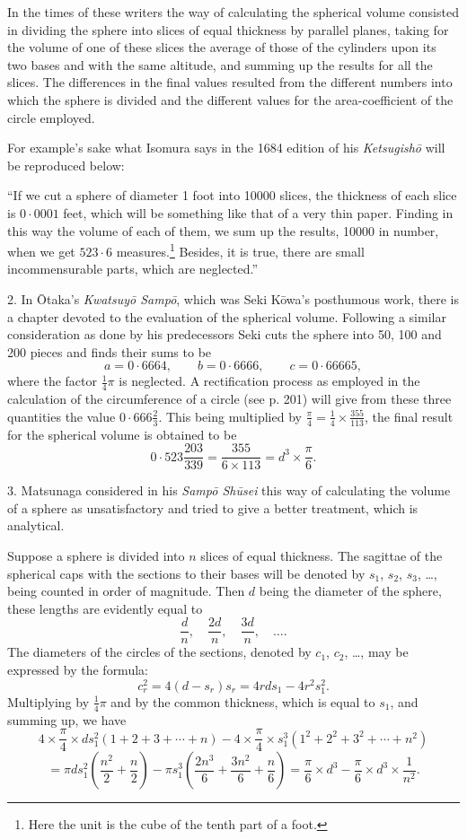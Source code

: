 \documentclass[11pt]{article}
\newcommand{\scanpage}[2]{\clearpage\setcounter{footnote}{0}\noindent{\footnotesize\color{gray}PDF page #1 · #2}\par\medskip}
\newcommand{\scanfooter}{}
\begin{document}
In the times of these writers the way of calculating the spherical volume consisted in dividing the sphere into slices of equal thickness by parallel planes, taking for the volume of one of these slices the average of those of the cylinders upon its two bases and with the same altitude, and summing up the results for all the slices. The differences in the final values resulted from the different numbers into which the sphere is divided and the different values for the area-coefficient of the circle employed.
\scanfooter

\scanpage{0218}{Chapter 26, printed page 204}
For example's sake what Isomura says in the 1684 edition of his \emph{Ketsugishō} will be reproduced below:

``If we cut a sphere of diameter 1 foot into 10000 slices, the thickness of each slice is $0\cdot0001$ feet, which will be something like that of a very thin paper. Finding in this way the volume of each of them, we sum up the results, 10000 in number, when we get $523\cdot6$ measures.\footnote{Here the unit is the cube of the tenth part of a foot.} Besides, it is true, there are small incommensurable parts, which are neglected.''

2. In Ōtaka's \emph{Kwatsuyō Sampō}, which was Seki Kōwa's posthumous work, there is a chapter devoted to the evaluation of the spherical volume. Following a similar consideration as done by his predecessors Seki cuts the sphere into 50, 100 and 200 pieces and finds their sums to be
\[
a=0\cdot6664,\qquad b=0\cdot6666,\qquad c=0\cdot66665,
\]
where the factor $\frac14\pi$ is neglected. A rectification process as employed in the calculation of the circumference of a circle (see p. 201) will give from these three quantities the value $0\cdot666\frac23$. This being multiplied by $\frac{\pi}{4}=\frac14\times\frac{355}{113}$, the final result for the spherical volume is obtained to be
\[
0\cdot523\frac{203}{339}=\frac{355}{6\times113}=d^3\times\frac{\pi}{6}.
\]

3. Matsunaga considered in his \emph{Sampō Shūsei} this way of calculating the volume of a sphere as unsatisfactory and tried to give a better treatment, which is analytical.

Suppose a sphere is divided into $n$ slices of equal thickness. The sagittae of the spherical caps with the sections to their bases will be denoted by $s_1$, $s_2$, $s_3$, \ldots, being counted in order of magnitude. Then $d$ being the diameter of the sphere, these lengths are evidently equal to
\[
\frac dn,\quad \frac{2d}{n},\quad \frac{3d}{n},\quad\ldots.
\]
The diameters of the circles of the sections, denoted by $c_1$, $c_2$, \ldots, may be expressed by the formula:
\[
c_r^2=4(d-s_r)s_r=4rds_1-4r^2s_1^2.
\]
Multiplying by $\frac14\pi$ and by the common thickness, which is equal to $s_1$, and summing up, we have
\[
4\times\frac{\pi}{4}\times ds_1^2(1+2+3+\cdots+n)-4\times\frac{\pi}{4}\times s_1^3(1^2+2^2+3^2+\cdots+n^2)
\]
\[
=\pi ds_1^2\left(\frac{n^2}{2}+\frac n2\right)-\pi s_1^3\left(\frac{2n^3}{6}+\frac{3n^2}{6}+\frac n6\right)=\frac{\pi}{6}\times d^3-\frac{\pi}{6}\times d^3\times\frac1{n^2}.
\]
\scanfooter
\end{document}
